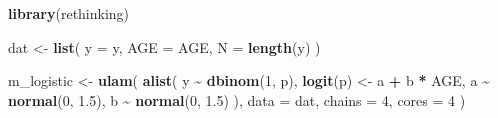 \documentclass[
]{book}
\newenvironment{Shaded}{\begin{snugshade}}{\end{snugshade}}
\newcommand{\AttributeTok}[1]{\textcolor[rgb]{0.13,0.29,0.53}{#1}}
\newcommand{\DecValTok}[1]{\textcolor[rgb]{0.00,0.00,0.81}{#1}}
\newcommand{\FloatTok}[1]{\textcolor[rgb]{0.00,0.00,0.81}{#1}}
\newcommand{\FunctionTok}[1]{\textcolor[rgb]{0.13,0.29,0.53}{\textbf{#1}}}
\newcommand{\NormalTok}[1]{#1}
\newcommand{\OtherTok}[1]{\textcolor[rgb]{0.56,0.35,0.01}{#1}}
\newcommand{\SpecialCharTok}[1]{\textcolor[rgb]{0.81,0.36,0.00}{\textbf{#1}}}
\begin{document}
\begin{Shaded}
\begin{Highlighting}[]
\FunctionTok{library}\NormalTok{(rethinking)}

\NormalTok{dat }\OtherTok{\textless{}{-}} \FunctionTok{list}\NormalTok{(}
  \AttributeTok{y =}\NormalTok{ y,}
  \AttributeTok{AGE =}\NormalTok{ AGE,}
  \AttributeTok{N =} \FunctionTok{length}\NormalTok{(y)}
\NormalTok{)}

\NormalTok{m\_logistic }\OtherTok{\textless{}{-}} \FunctionTok{ulam}\NormalTok{(}
  \FunctionTok{alist}\NormalTok{(}
\NormalTok{    y }\SpecialCharTok{\textasciitilde{}} \FunctionTok{dbinom}\NormalTok{(}\DecValTok{1}\NormalTok{, p),}
    \FunctionTok{logit}\NormalTok{(p) }\OtherTok{\textless{}{-}}\NormalTok{ a }\SpecialCharTok{+}\NormalTok{ b }\SpecialCharTok{*}\NormalTok{ AGE,}
\NormalTok{    a }\SpecialCharTok{\textasciitilde{}} \FunctionTok{normal}\NormalTok{(}\DecValTok{0}\NormalTok{, }\FloatTok{1.5}\NormalTok{),}
\NormalTok{    b }\SpecialCharTok{\textasciitilde{}} \FunctionTok{normal}\NormalTok{(}\DecValTok{0}\NormalTok{, }\FloatTok{1.5}\NormalTok{)}
\NormalTok{  ),}
  \AttributeTok{data =}\NormalTok{ dat,}
  \AttributeTok{chains =} \DecValTok{4}\NormalTok{,}
  \AttributeTok{cores =} \DecValTok{4}
\NormalTok{)}
\end{Highlighting}
\end{Shaded}
\end{document}
